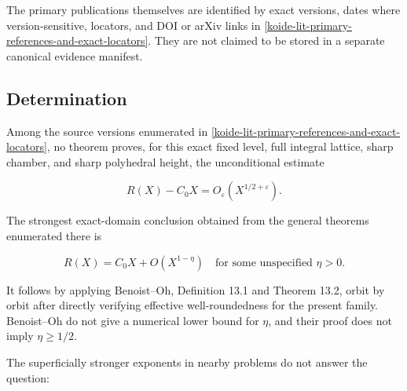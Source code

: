 The primary publications themselves are identified by exact versions,
dates where version-sensitive, locators, and DOI or arXiv links in
\cref{koide-lit-primary-references-and-exact-locators}.  They are not
claimed to be stored in a separate canonical evidence manifest.

\subsection{Determination}\label{koide-lit-determination}

Among the source versions enumerated in
\cref{koide-lit-primary-references-and-exact-locators}, no theorem proves,
for this exact fixed level, full integral lattice, sharp chamber, and sharp
polyhedral height, the unconditional estimate

\[
 R(X)-C_0X=O_\varepsilon(X^{1/2+\varepsilon}).
\]

The strongest exact-domain conclusion obtained from the general theorems
enumerated there is

\[
 \boxed{R(X)=C_0X+O(X^{1-\eta})\quad\text{for some unspecified }\eta>0.}
\]

It follows by applying Benoist--Oh, Definition 13.1 and Theorem 13.2, orbit by orbit after directly verifying effective well-roundedness for the present family. Benoist--Oh do not give a numerical lower bound for \(\eta\), and their proof does not imply \(\eta\geq 1/2\).

The superficially stronger exponents in nearby problems do not answer the question:

